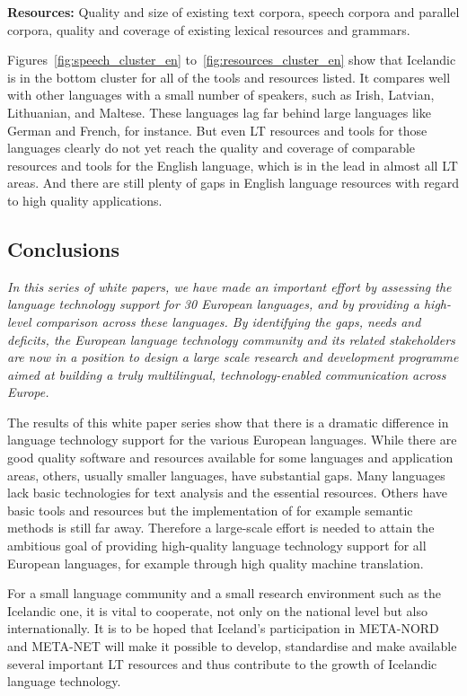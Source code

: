 \documentclass{../../metanetpaper}
\begin{document}
\begin{multicols}{2}
\textbf{Resources:} Quality and size of existing text corpora, speech corpora and parallel corpora, quality and coverage of existing lexical resources and grammars.

Figures~\ref{fig:speech_cluster_en} to~\ref{fig:resources_cluster_en} show that Icelandic is in the bottom cluster for all of the tools and resources listed. It compares well with other languages with a small number of speakers, such as Irish, Latvian, Lithuanian, and Maltese. These languages lag far behind large languages like German and French, for instance. But even LT resources and tools for those languages clearly do not yet reach the quality and coverage of comparable resources and tools for the English language, which is in the lead in almost all LT areas. And there are still plenty of gaps in English language resources with regard to high quality applications.

\subsection{Conclusions}

\emph{In this series of white papers, we have made an important effort by assessing the language technology support for 30 European languages, and by providing a high-level comparison across these languages. By identifying the gaps, needs and deficits, the European language technology community and its related stakeholders are now in a position to design a large scale research and development programme aimed at building a truly multilingual, technology-enabled communication across Europe.}

The results of this white paper series show that there is a dramatic difference in language technology support for the various European languages. While there are good quality software and resources available for some languages and application areas, others, usually smaller languages, have substantial gaps. Many languages lack basic technologies for text analysis and the essential resources. Others have basic tools and resources but the implementation of for example semantic methods is still far away. Therefore a large-scale effort is needed to attain the ambitious goal of providing high-quality language technology support for all European languages, for example through high quality machine translation. 

For a small language community and a small research environment such as the Icelandic one, it is vital to cooperate, not only on the national level but also internationally. It is to be hoped that Iceland’s participation in META-NORD and META-NET will make it possible to develop, standardise and make available several important LT resources and thus contribute to the growth of Icelandic language technology.


\end{multicols}
\end{document}
